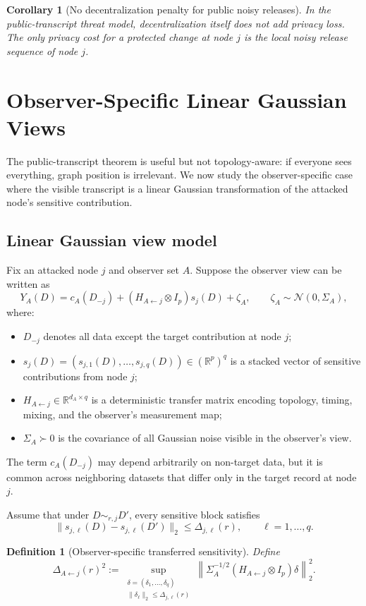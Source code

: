 \documentclass[conference,compsoc]{IEEEtran}
\newtheorem{definition}{Definition}
\newtheorem{corollary}{Corollary}
\newcommand{\R}{\mathbb{R}}
\newcommand{\N}{\mathcal{N}}
\begin{document}
\begin{corollary}[No decentralization penalty for public noisy releases]
In the public-transcript threat model, decentralization itself does not add privacy loss. The only privacy cost for a protected change at node $j$ is the local noisy release sequence of node $j$.
\end{corollary}

\section{Observer-Specific Linear Gaussian Views}
\label{sec:linear-gaussian}

The public-transcript theorem is useful but not topology-aware: if everyone sees everything, graph position is irrelevant. We now study the observer-specific case where the visible transcript is a linear Gaussian transformation of the attacked node's sensitive contribution.

\subsection{Linear Gaussian view model}

Fix an attacked node $j$ and observer set $A$. Suppose the observer view can be written as
\[
Y_A(D)
=
c_A(D_{-j})+(H_{A\leftarrow j}\otimes I_p)s_j(D)+\zeta_A,
\qquad
\zeta_A\sim\N(0,\Sigma_A),
\]
where:
\begin{itemize}[leftmargin=1.4em]
    \item $D_{-j}$ denotes all data except the target contribution at node $j$;
    \item $s_j(D)=(s_{j,1}(D),\ldots,s_{j,q}(D))\in(\R^p)^q$ is a stacked vector of sensitive contributions from node $j$;
    \item $H_{A\leftarrow j}\in\R^{d_A\times q}$ is a deterministic transfer matrix encoding topology, timing, mixing, and the observer's measurement map;
    \item $\Sigma_A\succ0$ is the covariance of all Gaussian noise visible in the observer's view.
\end{itemize}
The term $c_A(D_{-j})$ may depend arbitrarily on non-target data, but it is common across neighboring datasets that differ only in the target record at node $j$.

Assume that under $D\sim_{r,j}D'$, every sensitive block satisfies
\[
\|s_{j,\ell}(D)-s_{j,\ell}(D')\|_2\le\Delta_{j,\ell}(r),
\qquad
\ell=1,\ldots,q.
\]

\begin{definition}[Observer-specific transferred sensitivity]
Define
\[
\Delta_{A\leftarrow j}(r)^2
:=
\sup_{\substack{\delta=(\delta_1,\ldots,\delta_q)\\
\|\delta_\ell\|_2\le\Delta_{j,\ell}(r)}}
\left\|
\Sigma_A^{-1/2}(H_{A\leftarrow j}\otimes I_p)\delta
\right\|_2^2.
\]
\end{definition}
\end{document}
